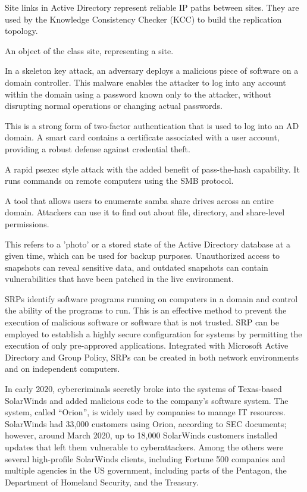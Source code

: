  Site links in Active Directory represent reliable IP paths between sites. They are used by the Knowledge Consistency Checker (KCC) to build the replication topology.

 An object of the class site, representing a site.

 In a skeleton key attack, an adversary deploys a malicious piece of software on a domain controller. This malware enables the attacker to log into any account within the domain using a password known only to the attacker, without disrupting normal operations or changing actual passwords.

 This is a strong form of two-factor authentication that is used to log into an AD domain. A smart card contains a certificate associated with a user account, providing a robust defense against credential theft.

 A rapid psexec style attack with the added benefit of pass-the-hash capability. It runs commands on remote computers using the SMB protocol.

 A tool that allows users to enumerate samba share drives across an entire domain. Attackers can use it to find out about file, directory, and share-level permissions.

 This refers to a 'photo' or a stored state of the Active Directory database at a given time, which can be used for backup purposes. Unauthorized access to snapshots can reveal sensitive data, and outdated snapshots can contain vulnerabilities that have been patched in the live environment.

 SRPs identify software programs running on computers in a domain and control the ability of the programs to run. This is an effective method to prevent the execution of malicious software or software that is not trusted. SRP can be employed to establish a highly secure configuration for systems by permitting the execution of only pre-approved applications. Integrated with Microsoft Active Directory and Group Policy, SRPs can be created in both network environments and on independent computers.

 In early 2020, cybercriminals secretly broke into the systems of Texas-based SolarWinds and added malicious code to the company's software system. The system, called “Orion”, is widely used by companies to manage IT resources. SolarWinds had 33,000 customers using Orion, according to SEC documents; however, around March 2020, up to 18,000 SolarWinds customers installed updates that left them vulnerable to cyberattackers. Among the others were several high-profile SolarWinds clients, including Fortune 500 companies and multiple agencies in the US government, including parts of the Pentagon, the Department of Homeland Security, and the Treasury.

